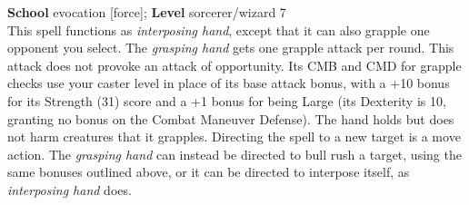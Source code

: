 \textbf{School} evocation [force]; \textbf{Level} sorcerer/wizard 7\\
This spell functions as \textit{interposing hand}, except that it can also grapple one opponent you select. The \textit{grasping hand} gets one grapple attack per round. This attack does not provoke an attack of opportunity. Its CMB and CMD for grapple checks use your caster level in place of its base attack bonus, with a +10 bonus for its Strength (31) score and a +1 bonus for being Large (its Dexterity is 10, granting no bonus on the Combat Maneuver Defense). The hand holds but does not harm creatures that it grapples. Directing the spell to a new target is a move action. The \textit{grasping hand} can instead be directed to bull rush a target, using the same bonuses outlined above, or it can be directed to interpose itself, as \textit{interposing hand} does.\\
